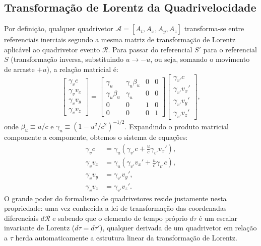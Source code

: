 \documentclass[11pt, a4paper]{article}
\begin{document}
\subsection{Transformação de Lorentz da Quadrivelocidade}

Por definição, qualquer quadrivetor $\mathcal{A} = [A_t, A_x, A_y, A_z]$ transforma-se entre referenciais inerciais segundo a mesma matriz de transformação de Lorentz aplicável ao quadrivetor evento $\mathcal{R}$. Para passar do referencial $S'$ para o referencial $S$ (transformação inversa, substituindo $u \to -u$, ou seja, somando o movimento de arraste $+u$), a relação matricial é:
\begin{equation}
\begin{bmatrix} \gamma_v c \\ \gamma_v v_x \\ \gamma_v v_y \\ \gamma_v v_z \end{bmatrix} = 
\begin{bmatrix} 
\gamma_u & \gamma_u \beta_u & 0 & 0 \\ 
\gamma_u \beta_u & \gamma_u & 0 & 0 \\ 
0 & 0 & 1 & 0 \\ 
0 & 0 & 0 & 1 
\end{bmatrix}
\begin{bmatrix} \gamma_{v'} c \\ \gamma_{v'} v_x' \\ \gamma_{v'} v_y' \\ \gamma_{v'} v_z' \end{bmatrix},
\end{equation}
onde $\beta_u \equiv u/c$ e $\gamma_u \equiv (1 - u^2/c^2)^{-1/2}$. Expandindo o produto matricial componente a componente, obtemos o sistema de equações:
\begin{align}
\gamma_v c &= \gamma_u \left( \gamma_{v'} c + \frac{u}{c} \gamma_{v'} v_x' \right), \label{eq:u0} \\
\gamma_v v_x &= \gamma_u \left( \gamma_{v'} v_x' + \frac{u}{c} \gamma_{v'} c \right), \label{eq:ux} \\
\gamma_v v_y &= \gamma_{v'} v_y', \label{eq:uy} \\
\gamma_v v_z &= \gamma_{v'} v_z'. \label{eq:uz}
\end{align}
O grande poder do formalismo de quadrivetores reside justamente nesta propriedade: uma vez conhecida a lei de transformação das coordenadas diferenciais $d\mathcal{R}$ e sabendo que o elemento de tempo próprio $d\tau$ é um escalar invariante de Lorentz ($d\tau = d\tau'$), qualquer derivada de um quadrivetor em relação a $\tau$ herda automaticamente a estrutura linear da transformação de Lorentz.
\end{document}

